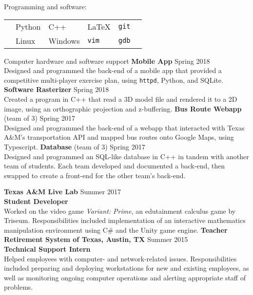 \documentclass[12pt]{article}
\begin{document}
\begin{flushleft}
\begin{outline}[compactitem]
        \vspace{.25em}
        \1 Programming and software:
        \\ \vspace{.2em}
        \begin{tabularx}{\textwidth}{X X X X X X}
            & Python   & C++ & \LaTeX & \verb|git|\upspace \\
            & Linux & Windows & \verb|vim| & \verb|gdb|\upspace \\
        \end{tabularx}
        \vspace{-.5em}
        \1 Computer hardware and software support
        \hfill\hfill
        \vspace{.25em}
        \1 \textbf{Mobile App} \hfill Spring 2018
        \\ Designed and programmed the back-end of a mobile app that provided a competitive multi-player exercise plan, using \verb|httpd|, Python, and SQLite.
        \1 \textbf{Software Rasterizer} \hfill Spring 2018
        \\ Created a program in C++ that read a 3D model file and rendered it to a 2D image, using an orthographic projection and z-buffering.
        \1 \textbf{Bus Route Webapp} (team of 3) \hfill Spring 2017
        \\ Designed and programmed the back-end of a webapp that interacted with Texas A\&M's transportation API and mapped bus routes onto Google Maps, using Typescript.
        \1 \textbf{Database} (team of 3) \hfill Spring 2017
        \\ Designed and programmed an SQL-like database in C++ in tandem with another team of students. Each team developed and documented a back-end, then swapped to create a front-end for the other team's back-end.

        \vspace{.25em}
        \1 \textbf{Texas A\&M Live Lab} \hfill Summer 2017
        \\ \textbf{Student Developer}
        \\ Worked on the video game \textit{Variant: Prime}, an edutainment calculus game by Triseum. Responsibilities included implementation of an interactive mathematics manipulation environment using C\# and the Unity game engine.
        \1 \textbf{Teacher Retirement System of Texas, Austin, TX} \hfill Summer 2015
        \\ \textbf{Technical Support Intern}
        \\ Helped employees with computer- and network-related issues. Responsibilities included preparing and deploying workstations for new and existing employees, as well as monitoring ongoing computer operations and alerting appropriate staff of problems.


\end{outline}
\end{flushleft}
\end{document}

